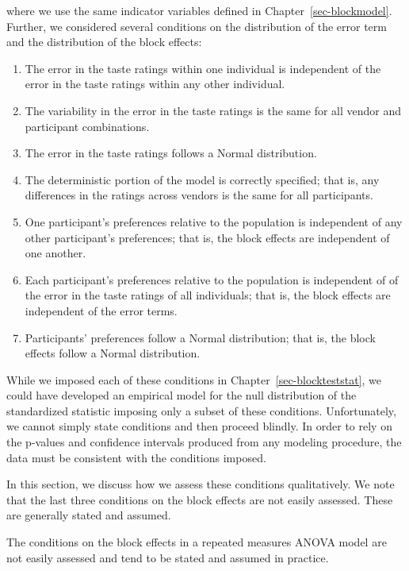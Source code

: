 \documentclass[
  letterpaper,
  DIV=11,
  numbers=noendperiod]{scrreprt}
\providecommand{\tightlist}{%
  \setlength{\itemsep}{0pt}\setlength{\parskip}{0pt}}\usepackage{longtable,booktabs,array}
\theoremstyle{plain}
\theoremstyle{definition}
\theoremstyle{definition}
\theoremstyle{remark}
\begin{document}
where we use the same indicator variables defined in
Chapter~\ref{sec-blockmodel}. Further, we considered several conditions
on the distribution of the error term and the distribution of the block
effects:

\begin{enumerate}
\def\labelenumi{\arabic{enumi}.}
\tightlist
\item
  The error in the taste ratings within one individual is independent of
  the error in the taste ratings within any other individual.
\item
  The variability in the error in the taste ratings is the same for all
  vendor and participant combinations.
\item
  The error in the taste ratings follows a Normal distribution.
\item
  The deterministic portion of the model is correctly specified; that
  is, any differences in the ratings across vendors is the same for all
  participants.
\item
  One participant's preferences relative to the population is
  independent of any other participant's preferences; that is, the block
  effects are independent of one another.
\item
  Each participant's preferences relative to the population is
  independent of of the error in the taste ratings of all individuals;
  that is, the block effects are independent of the error terms.
\item
  Participants' preferences follow a Normal distribution; that is, the
  block effects follow a Normal distribution.
\end{enumerate}

While we imposed each of these conditions in
Chapter~\ref{sec-blockteststat}, we could have developed an empirical
model for the null distribution of the standardized statistic imposing
only a subset of these conditions. Unfortunately, we cannot simply state
conditions and then proceed blindly. In order to rely on the p-values
and confidence intervals produced from any modeling procedure, the data
must be consistent with the conditions imposed.

In this section, we discuss how we assess these conditions
qualitatively. We note that the last three conditions on the block
effects are not easily assessed. These are generally stated and assumed.

\begin{tcolorbox}[enhanced jigsaw, breakable, titlerule=0mm, colframe=quarto-callout-warning-color-frame, bottomtitle=1mm, opacityback=0, rightrule=.15mm, toptitle=1mm, arc=.35mm, bottomrule=.15mm, left=2mm, title=\textcolor{quarto-callout-warning-color}{\faExclamationTriangle}\hspace{0.5em}{Warning}, leftrule=.75mm, coltitle=black, toprule=.15mm, colbacktitle=quarto-callout-warning-color!10!white, colback=white, opacitybacktitle=0.6]

The conditions on the block effects in a repeated measures ANOVA model
are not easily assessed and tend to be stated and assumed in practice.

\end{tcolorbox}
\end{document}
